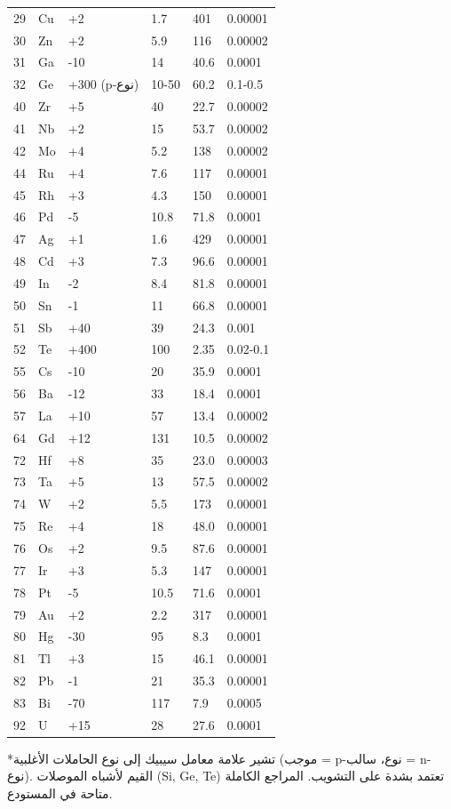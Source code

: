 \documentclass[11pt,a4paper]{article}
\begin{document}
\begin{otherlanguage}{arabic}
\begin{longtable}{p{0.8cm}p{1.2cm}p{2.2cm}p{2.2cm}p{2.2cm}p{2.2cm}}
			29 & Cu & +2 & 1.7 & 401 & 0.00001 \\
			30 & Zn & +2 & 5.9 & 116 & 0.00002 \\
			31 & Ga & -10 & 14 & 40.6 & 0.0001 \\
			32 & Ge & +300 (p-نوع) & 10-50 & 60.2 & 0.1-0.5 \\
			40 & Zr & +5 & 40 & 22.7 & 0.00002 \\
			41 & Nb & +2 & 15 & 53.7 & 0.00002 \\
			42 & Mo & +4 & 5.2 & 138 & 0.00002 \\
			44 & Ru & +4 & 7.6 & 117 & 0.00001 \\
			45 & Rh & +3 & 4.3 & 150 & 0.00001 \\
			46 & Pd & -5 & 10.8 & 71.8 & 0.0001 \\
			47 & Ag & +1 & 1.6 & 429 & 0.00001 \\
			48 & Cd & +3 & 7.3 & 96.6 & 0.00001 \\
			49 & In & -2 & 8.4 & 81.8 & 0.00001 \\
			50 & Sn & -1 & 11 & 66.8 & 0.00001 \\
			51 & Sb & +40 & 39 & 24.3 & 0.001 \\
			52 & Te & +400 & 100 & 2.35 & 0.02-0.1 \\
			55 & Cs & -10 & 20 & 35.9 & 0.0001 \\
			56 & Ba & -12 & 33 & 18.4 & 0.0001 \\
			57 & La & +10 & 57 & 13.4 & 0.00002 \\
			64 & Gd & +12 & 131 & 10.5 & 0.00002 \\
			72 & Hf & +8 & 35 & 23.0 & 0.00003 \\
			73 & Ta & +5 & 13 & 57.5 & 0.00002 \\
			74 & W  & +2 & 5.5 & 173 & 0.00001 \\
			75 & Re & +4 & 18 & 48.0 & 0.00001 \\
			76 & Os & +2 & 9.5 & 87.6 & 0.00001 \\
			77 & Ir & +3 & 5.3 & 147 & 0.00001 \\
			78 & Pt & -5 & 10.5 & 71.6 & 0.0001 \\
			79 & Au & +2 & 2.2 & 317 & 0.00001 \\
			80 & Hg & -30 & 95 & 8.3 & 0.0001 \\
			81 & Tl & +3 & 15 & 46.1 & 0.00001 \\
			82 & Pb & -1 & 21 & 35.3 & 0.00001 \\
			83 & Bi & -70 & 117 & 7.9 & 0.0005 \\
			92 & U  & +15 & 28 & 27.6 & 0.0001 \\
			\bottomrule
		\end{longtable}
		*تشير علامة معامل سيبيك إلى نوع الحاملات الأغلبية (موجب = p-نوع، سالب = n-نوع). القيم لأشباه الموصلات (Si, Ge, Te) تعتمد بشدة على التشويب. المراجع الكاملة متاحة في المستودع.
		

\end{otherlanguage}
\end{document}
